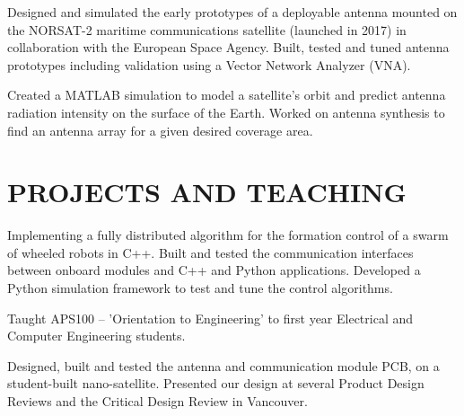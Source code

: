 \documentclass{ResumeTemplate}
\begin{document}
    \workitemstwo
    {Designed and simulated the early prototypes of a deployable antenna mounted on the NORSAT-2 maritime communications satellite (launched in 2017) in collaboration with the European Space Agency.}
    {Built, tested and tuned antenna prototypes including validation using a Vector Network Analyzer (VNA).}
    
    
    \workitemsone
    {Created a MATLAB simulation to model a satellite's orbit and predict antenna radiation intensity on the surface of the Earth. Worked on antenna synthesis to find an antenna array for a given desired coverage area.}
    
    \section{PROJECTS AND TEACHING}
    

    \workitemsthree
    {Implementing a fully distributed algorithm for the formation control of a swarm of wheeled robots in C++.}
    {Built and tested the communication interfaces between onboard modules and C++ and Python applications.}
    {Developed a Python simulation framework to test and tune the control algorithms. }
    

    \workitemsone
    {Taught APS100 -- 'Orientation to Engineering' to first year Electrical and Computer Engineering students.}
    

    \workitemstwo
    {Designed, built and tested the antenna and communication module PCB, on a student-built nano-satellite.}
    {Presented our design at several Product Design Reviews and the Critical Design Review in Vancouver.}
\end{document}
